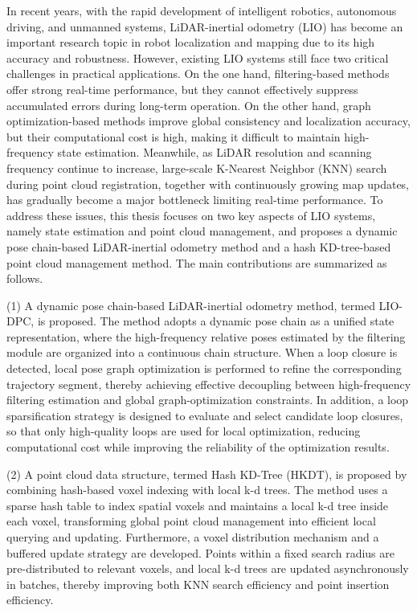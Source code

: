 \begin{eabstract}	%

In recent years, with the rapid development of intelligent robotics, autonomous driving, and unmanned systems, LiDAR-inertial odometry (LIO) has become an important research topic in robot localization and mapping due to its high accuracy and robustness. However, existing LIO systems still face two critical challenges in practical applications. On the one hand, filtering-based methods offer strong real-time performance, but they cannot effectively suppress accumulated errors during long-term operation. On the other hand, graph optimization-based methods improve global consistency and localization accuracy, but their computational cost is high, making it difficult to maintain high-frequency state estimation. Meanwhile, as LiDAR resolution and scanning frequency continue to increase, large-scale K-Nearest Neighbor (KNN) search during point cloud registration, together with continuously growing map updates, has gradually become a major bottleneck limiting real-time performance. To address these issues, this thesis focuses on two key aspects of LIO systems, namely state estimation and point cloud management, and proposes a dynamic pose chain-based LiDAR-inertial odometry method and a hash KD-tree-based point cloud management method. The main contributions are summarized as follows.

(1) A dynamic pose chain-based LiDAR-inertial odometry method, termed LIO-DPC, is proposed. The method adopts a dynamic pose chain as a unified state representation, where the high-frequency relative poses estimated by the filtering module are organized into a continuous chain structure. When a loop closure is detected, local pose graph optimization is performed to refine the corresponding trajectory segment, thereby achieving effective decoupling between high-frequency filtering estimation and global graph-optimization constraints. In addition, a loop sparsification strategy is designed to evaluate and select candidate loop closures, so that only high-quality loops are used for local optimization, reducing computational cost while improving the reliability of the optimization results.

(2) A point cloud data structure, termed Hash KD-Tree (HKDT), is proposed by combining hash-based voxel indexing with local k-d trees. The method uses a sparse hash table to index spatial voxels and maintains a local k-d tree inside each voxel, transforming global point cloud management into efficient local querying and updating. Furthermore, a voxel distribution mechanism and a buffered update strategy are developed. Points within a fixed search radius are pre-distributed to relevant voxels, and local k-d trees are updated asynchronously in batches, thereby improving both KNN search efficiency and point insertion efficiency.


\end{eabstract}
